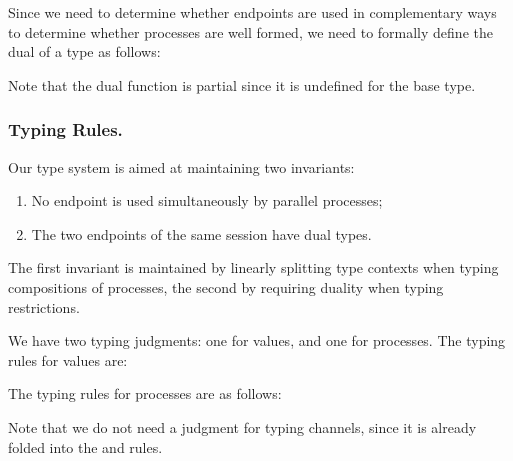 Since we need to determine whether endpoints are used in complementary ways to determine whether processes are well formed, we need to formally define the dual of a type as follows:
Note that the dual function is partial since it is undefined for the base type.

\subsubsection{Typing Rules.}
Our type system is aimed at maintaining two invariants:
\begin{enumerate}
\item No endpoint is used simultaneously by parallel processes;
\item The two endpoints of the same session have dual types.
\end{enumerate}
The first invariant is maintained by linearly splitting type contexts when typing compositions of processes, the second by requiring duality when typing restrictions.

We have two typing judgments: one for values, and one for processes.
The typing rules for values are:
The typing rules for processes are as follows:
Note that we do not need a judgment for typing channels, since it is already folded into the  and  rules.

